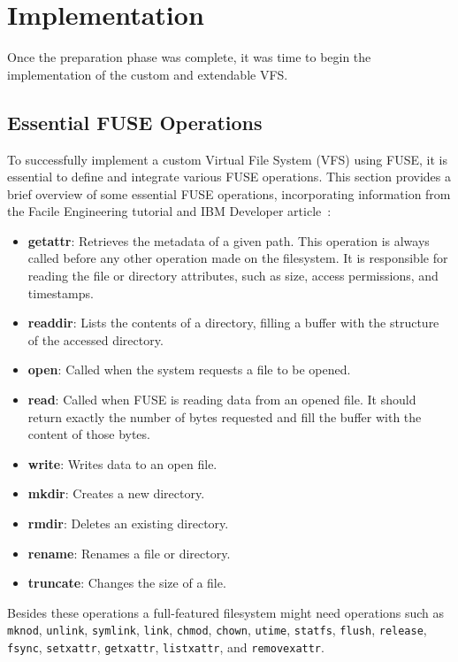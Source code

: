 \chapter{Implementation}
\label{chap:implementation}

Once the preparation phase was complete, it was time to begin the implementation of the custom and extendable VFS\@.

\section{Essential FUSE Operations}\label{sec:fuse-ops}

To successfully implement a custom Virtual File System (VFS) using FUSE, it is essential to define and integrate various FUSE operations.
This section provides a brief overview of some essential FUSE operations, incorporating information from the Facile Engineering tutorial and IBM Developer article~\cite{ibm_fuse, facile_fuse}:

\begin{itemize}
    \item \textbf{getattr}: Retrieves the metadata of a given path.
    This operation is always called before any other operation made on the filesystem.
    It is responsible for reading the file or directory attributes, such as size, access permissions, and timestamps.
    \item \textbf{readdir}: Lists the contents of a directory, filling a buffer with the structure of the accessed directory.
    \item \textbf{open}: Called when the system requests a file to be opened.
    \item \textbf{read}: Called when FUSE is reading data from an opened file.
    It should return exactly the number of bytes requested and fill the buffer with the content of those bytes.
    \item \textbf{write}: Writes data to an open file.
    \item \textbf{mkdir}: Creates a new directory.
    \item \textbf{rmdir}: Deletes an existing directory.
    \item \textbf{rename}: Renames a file or directory.
    \item \textbf{truncate}: Changes the size of a file.
\end{itemize}

Besides these operations a full-featured filesystem might need operations such as \texttt{mknod}, \texttt{unlink}, \texttt{symlink}, \texttt{link}, \texttt{chmod}, \texttt{chown}, \texttt{utime}, \texttt{statfs}, \texttt{flush}, \texttt{release}, \texttt{fsync}, \texttt{setxattr}, \texttt{getxattr}, \texttt{listxattr}, and \texttt{removexattr}.

